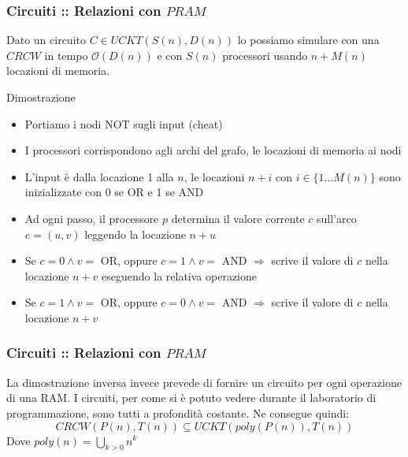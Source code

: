 \documentclass{beamer}
\newcommand{\bigO}{\ensuremath{\mathcal{O}}} %
\begin{document}
\begin{frame}
	\frametitle{Circuiti :: Relazioni con $PRAM$} %
	Dato un circuito $C \in UCKT(S(n),D(n))$ lo possiamo simulare con una $CRCW$ in tempo $\bigO{(D(n))}$ e con $S(n)$ processori usando $n + M(n)$ locazioni di memoria.
	\begin{block}{Dimostrazione}
		\begin{itemize}
			\item Portiamo i nodi NOT sugli input (cheat)
			\item I processori corrispondono agli archi del grafo, le locazioni di memoria ai nodi
			\item L'input è dalla locazione 1 alla $n$, le locazioni $n+i$ con $i\in\{1\dots M(n)\}$ sono inizializzate con 0 se OR e 1 se AND
			\item Ad ogni passo, il processore $p$ determina il valore corrente $c$ sull'arco $e=(u,v)$ leggendo la locazione $n+u$
			\item Se $c=0 \wedge v=$  OR, oppure $c=1 \wedge v=$ AND $\Longrightarrow$ scrive il valore di $c$ nella locazione $n+v$ eseguendo la relativa operazione
			\item Se $c=1 \wedge v=$  OR, oppure $c=0 \wedge v=$ AND $\Longrightarrow$ scrive il valore di $c$ nella locazione $n+v$
		\end{itemize}
	\end{block}
\end{frame}

\begin{frame}
	\frametitle{Circuiti :: Relazioni con $PRAM$} %
	La dimostrazione inversa invece prevede di fornire un circuito per ogni operazione di una RAM.
	I circuiti, per come si è potuto vedere durante il laboratorio di programmazione, sono tutti a profondità costante.
	Ne consegue quindi:
	\begin{equation}
		CRCW(P(n),T(n)) \subseteq UCKT(poly(P(n)), T(n))
	\end{equation}
	Dove $poly(n) = \bigcup_{k>0} n^k$
\end{frame}
\end{document}
